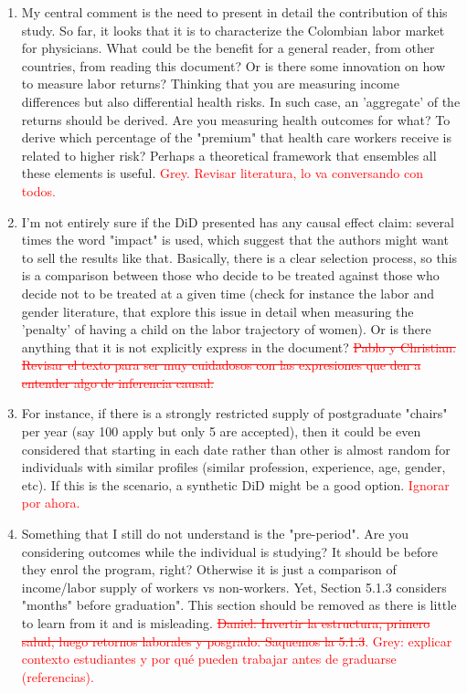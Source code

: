 \documentclass[12pt]{article}
\begin{document}
\begin{enumerate}
    \item My central comment is the need to present in detail the contribution of this study. So far, it looks that it is to characterize the Colombian labor market for physicians. What could be the benefit for a general reader, from other countries, from reading this document? Or is there some innovation on how to measure labor returns? Thinking that you are measuring income differences but also differential health risks. In such case, an 'aggregate' of the returns should be derived. Are you measuring health outcomes for what? To derive which percentage of the "premium" that health care workers receive is related to higher risk? Perhaps a theoretical framework that ensembles all these elements is useful. \textcolor{red}{Grey. Revisar literatura, lo va conversando con todos.} 
    \item I'm not entirely sure if the DiD presented has any causal effect claim: several times the word "impact" is used, which suggest that the authors might want to sell the results like that. Basically, there is a clear selection process, so this is a comparison between those who decide to be treated against those who decide not to be treated at a given time (check for instance the labor and gender literature, that explore this issue in detail when measuring the 'penalty' of having a child on the labor trajectory of women). Or is there anything that it is not explicitly express in the document?  \textcolor{red}{\st{Pablo y Christian. Revisar el texto para ser muy cuidadosos con las expresiones que den a entender algo de inferencia causal.}} 
    \item For instance, if there is a strongly restricted supply of postgraduate "chairs" per year (say 100 apply but only 5 are accepted), then it could be even considered that starting in each date rather than other is almost random for individuals with similar profiles (similar profession, experience, age, gender, etc). If this is the scenario, a synthetic DiD might be a good option.  \textcolor{red}{Ignorar por ahora.} 
    \item Something that I still do not understand is the "pre-period". Are you considering outcomes while the individual is studying? It should be before they enrol the program, right? Otherwise it is just a comparison of income/labor supply of workers vs non-workers. Yet, Section 5.1.3 considers "months" before graduation". This section should be removed as there is little to learn from it and is misleading. \textcolor{red}{\st{Daniel: Invertir la estructura, primero salud, luego retornos laborales y posgrado. Saquemos la 5.1.3}. Grey: explicar contexto estudiantes y por qué pueden trabajar antes de graduarse (referencias).} 
\end{enumerate}
\end{document}
